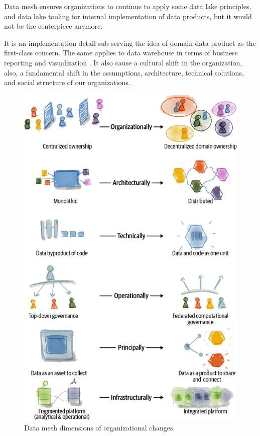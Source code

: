 \documentclass[12pt, a4paper]{book}
\begin{document}
Data mesh ensures organizations to continue to apply some data lake principles, and data lake tooling for internal implementation of data products, but it would not be the centerpiece anymore.

It is an implementation detail sub-serving the idea of domain data product as the first-class concern. The same applies to data warehouse in terms of business reporting and visualization \cite{shiftkpmg}. It also cause a cultural shift in the organization, also, a fundamental shift in the assumptions, architecture, technical solutions, and social structure of our organizations. \cite{datamesh2022ch1}

\begin{figure}[ht]
	\vspace*{-.3cm}
	\begin{framed}
		\centering
		\includegraphics[width=12cm]{OrgChanges.png}
		\caption{Data mesh dimensions of organizational changes}
		\label{orgchange}
	\end{framed}
\end{figure}
\end{document}
